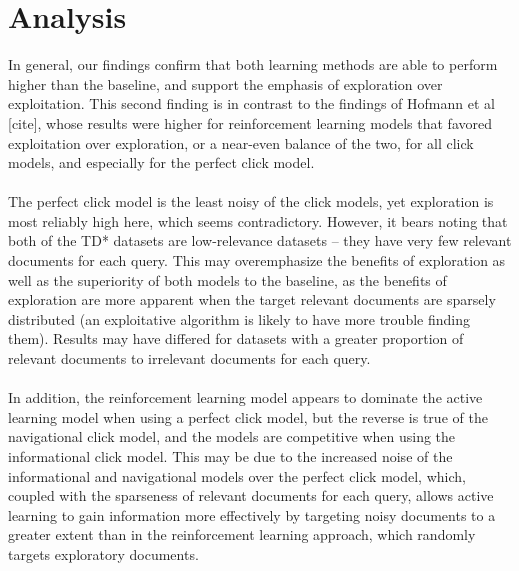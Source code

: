\documentclass{acm_proc_article-sp}
\begin{document}
\section{Analysis}
In general, our findings confirm that both learning methods are able to perform higher than the baseline, and support the emphasis of exploration over exploitation.  This second finding is in contrast to the findings of Hofmann et al [cite], whose results were higher for reinforcement learning models that favored exploitation over exploration, or a near-even balance of the two, for all click models, and especially for the perfect click model. \\ \\
The perfect click model is the least noisy of the click models, yet exploration is most reliably high here, which seems contradictory.  However, it bears noting that both of the TD* datasets are low-relevance datasets – they have very few relevant documents for each query.  This may overemphasize the benefits of exploration as well as the superiority of both models to the baseline, as the benefits of exploration are more apparent when the target relevant documents are sparsely distributed (an exploitative algorithm is likely to have more trouble finding them).  Results may have differed for datasets with a greater proportion of relevant documents to irrelevant documents for each query.  \\ \\
In addition, the reinforcement learning model appears to dominate the active learning model when using a perfect click model, but the reverse is true of the navigational click model, and the models are competitive when using the informational click model.  This may be due to the increased noise of the informational and navigational models over the perfect click model, which, coupled with the sparseness of relevant documents for each query, allows active learning to gain information more effectively by targeting noisy documents to a greater extent than in the reinforcement learning approach, which randomly targets exploratory documents.   \\ \\




\balancecolumns
\end{document}
